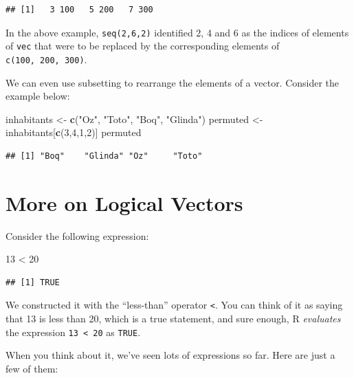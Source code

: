 \documentclass[]{book}
\makeatletter
\newenvironment{Shaded}{\begin{snugshade}}{\end{snugshade}}
\newcommand{\KeywordTok}[1]{\textcolor[rgb]{0.13,0.29,0.53}{\textbf{{#1}}}}
\newcommand{\DecValTok}[1]{\textcolor[rgb]{0.00,0.00,0.81}{{#1}}}
\newcommand{\StringTok}[1]{\textcolor[rgb]{0.31,0.60,0.02}{{#1}}}
\newcommand{\NormalTok}[1]{{#1}}
\newenvironment{kframe}{%
\medskip{}
\setlength{\fboxsep}{.8em}
 \def\at@end@of@kframe{}%
 \ifinner\ifhmode%
  \def\at@end@of@kframe{\end{minipage}}%
  \begin{minipage}{\columnwidth}%
 \fi\fi%
 \def\FrameCommand##1{\hskip\@totalleftmargin \hskip-\fboxsep
 \colorbox{shadecolor}{##1}\hskip-\fboxsep
     \hskip-\linewidth \hskip-\@totalleftmargin \hskip\columnwidth}%
 \MakeFramed {\advance\hsize-\width
   \@totalleftmargin\z@ \linewidth\hsize
   \@setminipage}}%
 {\par\unskip\endMakeFramed%
 \at@end@of@kframe}
\renewenvironment{Shaded}{\begin{kframe}}{\end{kframe}}
\theoremstyle{definition}
\theoremstyle{definition}
\theoremstyle{remark}
\makeatother
\begin{document}
\begin{verbatim}
## [1]   3 100   5 200   7 300
\end{verbatim}

In the above example, \texttt{seq(2,6,2)} identified 2, 4 and 6 as the
indices of elements of \texttt{vec} that were to be replaced by the
corresponding elements of \texttt{c(100,\ 200,\ 300)}.

We can even use subsetting to rearrange the elements of a vector.
Consider the example below:

\begin{Shaded}
\begin{Highlighting}[]
\NormalTok{inhabitants <-}\StringTok{ }\KeywordTok{c}\NormalTok{(}\StringTok{"Oz"}\NormalTok{, }\StringTok{"Toto"}\NormalTok{, }\StringTok{"Boq"}\NormalTok{, }\StringTok{"Glinda"}\NormalTok{)}
\NormalTok{permuted <-}\StringTok{ }\NormalTok{inhabitants[}\KeywordTok{c}\NormalTok{(}\DecValTok{3}\NormalTok{,}\DecValTok{4}\NormalTok{,}\DecValTok{1}\NormalTok{,}\DecValTok{2}\NormalTok{)]}
\NormalTok{permuted}
\end{Highlighting}
\end{Shaded}

\begin{verbatim}
## [1] "Boq"    "Glinda" "Oz"     "Toto"
\end{verbatim}

\section{More on Logical Vectors}\label{more-on-logical-vectors}

Consider the following expression:

\begin{Shaded}
\begin{Highlighting}[]
\DecValTok{13} \NormalTok{<}\StringTok{ }\DecValTok{20}
\end{Highlighting}
\end{Shaded}

\begin{verbatim}
## [1] TRUE
\end{verbatim}

We constructed it with the ``less-than'' operator \texttt{\textless{}}.
You can think of it as saying that 13 is less than 20, which is a true
statement, and sure enough, R \emph{evaluates} the expression
\texttt{13\ \textless{}\ 20} as \texttt{TRUE}.

When you think about it, we've seen lots of expressions so far. Here are
just a few of them:
\end{document}
